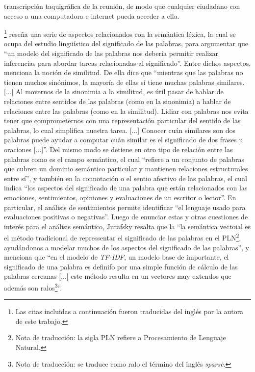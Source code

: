transcripci\'on taquigr\'afica de la reuni\'on, de modo que cualquier ciudadano con
acceso a una computadora e internet pueda acceder a ella.
\par
\cite{jurafsky2000speech}\footnote{
Las citas incluidas a continuaci\'on fueron traducidas del ingl\'es por
la autora de este trabajo.}
reseña una serie de aspectos relacionados con la semántica léxica, la cual se ocupa
del estudio lingü\'istico del significado de las palabras, para argumentar que
``un modelo del significado de las palabras nos debería permitir realizar inferencias
para abordar tareas relacionadas al significado''. Entre dichos aspectos, menciona
la noción de similitud. De ella dice que ``mientras que las palabras no tienen muchos
sin\'onimos, la mayoría de ellas s\'i tiene muchas palabras similares. [...]
Al movernos de la sinonimia a la similitud, es \'util pasar de hablar de relaciones
entre sentidos de las palabras (como en la sinonimia) a hablar de relaciones entre las
palabras (como en la similitud). Lidiar con palabras nos evita tener que comprometernos
con una representaci\'on particular del sentido de las palabras, lo cual simplifica
nuestra tarea. [...] Conocer cuán similares son dos palabras puede ayudar a computar
cuán similar es el significado de dos frases u oraciones [...]''. Del mismo modo
se detiene en otro tipo de relaci\'on entre las palabras como es el campo
sem\'antico, el cual ``refiere a un conjunto de palabras que cubren un dominio
sem\'antico particular y mantienen relaciones estructurales entre s\'i'', y también en
la connotación o el sentio afectivo de las palabras, el cual indica ``los
aspectos del significado de una palabra que est\'an relacionados con las emociones,
sentimientos, opiniones y evaluaciones de un escritor o lector''. En particular,
el an\'alisis de sentimientos permite identificar ``el lenguaje usado para evaluaciones
positivas o negativas''. Luego de enunciar estas y otras cuestiones de interés para
el an\'alisis sem\'antico, Jurafsky resalta que la ``la semántica vectoial es el método
tradicional de repressentar el significado de las palabras en el PLN\footnote{Nota de
traducci\'on: la sigla PLN refiere a Procesamiento de Lenguaje Natural.}, ayud\'andonos
a modelar muchos de los aspectos del significado de las palabras'', y menciona que
``en el modelo de \textit{TF-IDF}, un modelo base de importante, el significado
de una palabra es definifo por una simple funci\'on de c\'alculo de las palabras
cercanas [...] este m\'etodo resulta en un vectores muy extendos que adem\'as
son ralos\footnote{Nota de traducci\'on: se traduce como ralo el t\'ermino del ingl\'es
\textit{sparse}.}''.
